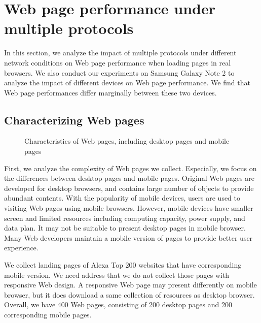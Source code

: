 \section{Web page performance under multiple protocols}

In this section, we analyze the impact of multiple protocols under different network conditions on Web page performance when loading pages in real browsers. We also conduct our experiments on Samsung Galaxy Note 2 to analyze the impact of different devices on Web page performance. We find that Web page performances differ marginally between these two devices.

\subsection{Characterizing Web pages}
\begin{figure}[htbp]
\centering
{}
\caption{Characteristics of Web pages, including desktop pages and mobile pages}
\label{fig:characteristics_of_pages}
\end{figure}

First, we analyze the complexity of Web pages we collect. Especially, we focus on the differences between desktop pages and mobile pages. Original Web pages are developed for desktop browsers, and contains large number of objects to provide abundant contents. With the popularity of mobile devices, users are used to visiting Web pages using mobile browsers. However, mobile devices have smaller screen and limited resources including computing capacity, power supply, and data plan. It may not be suitable to present desktop pages in mobile browser. Many Web developers maintain a mobile version of pages to provide better user experience. 

We collect landing pages of Alexa Top 200 websites that have corresponding mobile version. We need address that we do not collect those pages with responsive Web design. A responsive Web page may present differently on mobile browser, but it does download a same collection of resources as desktop browser. Overall, we have 400 Web pages, consisting of 200 desktop pages and 200 corresponding mobile pages. 

